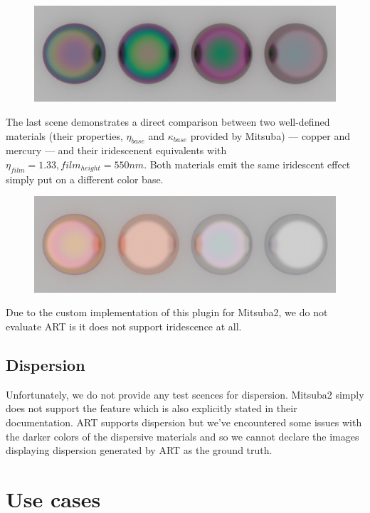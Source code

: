 \begin{description}
\begin{figure}[H]
		\centering
		\includegraphics[width=.9\linewidth]{img/iridescent_spheres_film.png}
		\caption{}
		\label{fig:irid_ior}
	\end{figure}
	\item[Materials~\ref{fig:irid_mat}] The last scene demonstrates a direct comparison between two well-defined materials (their properties, $\eta_{base}$ and $\kappa_{base}$ provided by Mitsuba) --- copper and mercury --- and their iridescenent equivalents with $\eta_{film}=1.33,film_{height}=550nm$. Both materials emit the same iridescent effect simply put on a  different color base.
	\begin{figure}[H]
		\centering
		\includegraphics[width=.9\linewidth]{img/iridescent_spheres_materials.png}
		\caption{}
		\label{fig:irid_mat}
	\end{figure}
\end{description}

Due to the custom implementation of this plugin for Mitsuba2, we do not evaluate ART is it does not support iridescence at all.

\subsection{Dispersion}

Unfortunately, we do not provide any test scences for dispersion. Mitsuba2 simply does not support the feature which is also explicitly stated in their documentation. ART supports dispersion but we've encountered some issues with the darker colors of the dispersive materials and so we cannot declare the images displaying dispersion generated by ART as the ground truth.

\section{Use cases}

